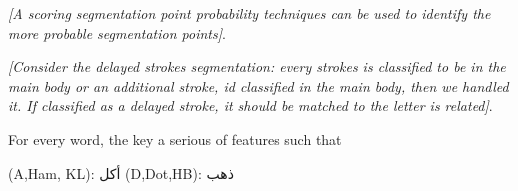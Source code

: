 \documentclass[journal,compsoc]{IEEEtran}
\begin{document}
\emph{[A scoring segmentation point probability techniques can be used to identify the more probable segmentation points]}.

\emph{[Consider the delayed strokes segmentation: every strokes is classified to be in the main body or an additional stroke, id classified in the main body, then we handled it. If classified as a delayed stroke, it should be matched to the letter is related]}.

For every word, the key a serious of features such that

(A,Ham, KL): أكل
(D,Dot,HB): ذهب




\end{document}
